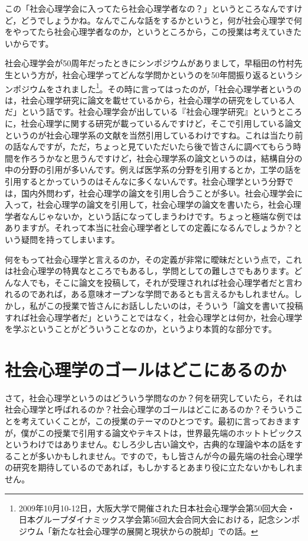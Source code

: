 \documentclass{ltjsbook}
\begin{document}
この「社会心理学会に入ってたら社会心理学者なの？」というところなんですけど，どうでしょうかね。なんでこんな話をするかというと，何が社会心理学で何をやってたら社会心理学者なのか，というところから，この授業は考えていきたいからです。

社会心理学会が50周年だったときにシンポジウムがありまして，早稲田の竹村先生という方が，社会心理学ってどんな学問かというのを50年間振り返るというシンポジウムをされました\footnote{2009年10月10-12日，大阪大学で開催された日本社会心理学会第50回大会・日本グループダイナミックス学会第56回大会合同大会における，記念シンポジウム「新たな社会心理学の展開と現状からの脱却」での話。}。その時に言ってはったのが，「社会心理学者というのは，社会心理学研究に論文を載せているから，社会心理学の研究をしている人だ」という話です。社会心理学会が出している『社会心理学研究』というところに，社会心理学に関する研究が載っているんですけど，そこで引用している論文というのが社会心理学系の文献を当然引用しているわけですね。これは当たり前の話なんですが，ただ，ちょっと見ていただいたら後で皆さんに調べてもらう時間を作ろうかなと思うんですけど，社会心理学系の論文というのは，結構自分の中の分野の引用が多いんです。例えば医学系の分野を引用するとか，工学の話を引用するとかっていうのはそんなに多くないんです。社会心理学という分野では，国内外問わず，社会心理学の論文を引用し合うことが多い。社会心理学会に入って，社会心理学の論文を引用して，社会心理学の論文を書いたら，社会心理学者なんじゃないか，という話になってしまうわけです。ちょっと極端な例ではありますが。それって本当に社会心理学者としての定義になるんでしょうか？という疑問を持ってしまいます。

何をもって社会心理学と言えるのか，その定義が非常に曖昧だという点で，これは社会心理学の特異なところでもあるし，学問としての難しさでもあります。どんな人でも，そこに論文を投稿して，それが受理されれば社会心理学者だと言われるのであれば，ある意味オープンな学問であるとも言えるかもしれません。しかし，私がこの授業で皆さんにお話ししたいのは，そういう「論文を書いて投稿すれば社会心理学者だ」ということではなく，社会心理学とは何か，社会心理学を学ぶということがどういうことなのか，というより本質的な部分です。

\section{社会心理学のゴールはどこにあるのか}

さて，社会心理学というのはどういう学問なのか？何を研究していたら，それは社会心理学と呼ばれるのか？社会心理学のゴールはどこにあるのか？そういうことを考えていくことが，この授業のテーマのひとつです。最初に言っておきますが，僕がこの授業で引用する論文やテキストは，世界最先端のホットトピックスというわけではありません。むしろ少し古い論文や，古典的な理論や本の話をすることが多いかもしれません。ですので，もし皆さんが今の最先端の社会心理学の研究を期待しているのであれば，もしかするとあまり役に立たないかもしれません。
\end{document}
